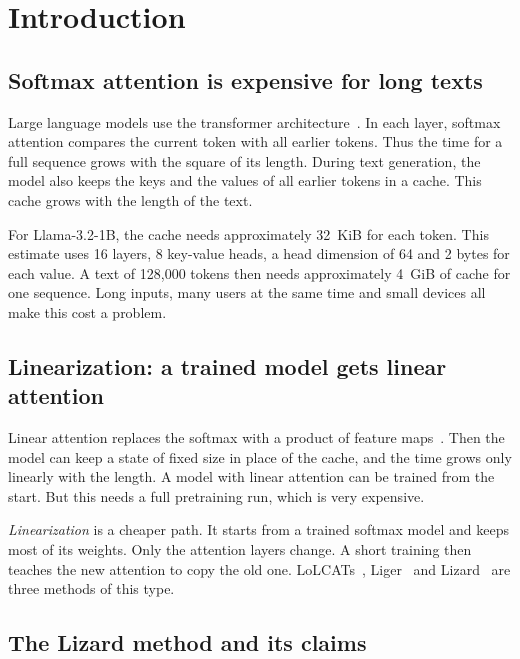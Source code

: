 \chapter{Introduction}
\label{ch:intro}

\section{Softmax attention is expensive for long texts}
\label{sec:intro-cost}

Large language models use the transformer architecture~\cite{vaswani2017}. In each layer, softmax attention compares the current token with all earlier tokens. Thus the time for a full sequence grows with the square of its length. During text generation, the model also keeps the keys and the values of all earlier tokens in a cache. This cache grows with the length of the text.

For Llama-3.2-1B, the cache needs approximately 32~KiB for each token. This estimate uses 16 layers, 8 key-value heads, a head dimension of 64 and 2 bytes for each value. A text of 128,000 tokens then needs approximately 4~GiB of cache for one sequence. Long inputs, many users at the same time and small devices all make this cost a problem.

\section{Linearization: a trained model gets linear attention}
\label{sec:intro-linearization}

Linear attention replaces the softmax with a product of feature maps~\cite{katharopoulos2020}. Then the model can keep a state of fixed size in place of the cache, and the time grows only linearly with the length. A model with linear attention can be trained from the start. But this needs a full pretraining run, which is very expensive.

\emph{Linearization} is a cheaper path. It starts from a trained softmax model and keeps most of its weights. Only the attention layers change. A short training then teaches the new attention to copy the old one. LoLCATs~\cite{lolcats}, Liger~\cite{liger} and Lizard~\cite{lizard} are three methods of this type.

\section{The Lizard method and its claims}
\label{sec:intro-lizard}

